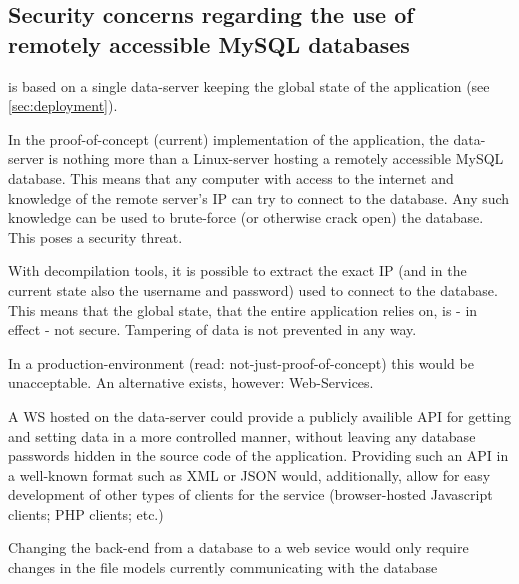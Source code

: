 \subsection{Security concerns regarding the use of remotely accessible MySQL databases}
\label{sec:mysqlvswebservice}

\SOP{} is based on a single data-server keeping the global state of the application (see \ref{sec:deployment}).

In the proof-of-concept (current) implementation of the application, the data-server is nothing more than a Linux-server
hosting a remotely accessible MySQL database. This means that any computer with access to the internet and knowledge of
the remote server's IP can try to connect to the database. Any such knowledge can be used to brute-force (or otherwise
crack open) the database. This poses a security threat.

With decompilation tools, it is possible to extract the exact IP (and in the current state also the username and password)
used to connect to the database. This means that the global state, that the entire application relies on, is - in effect -
not secure. Tampering of data is not prevented in any way.

In a production-environment (read: not-just-proof-of-concept) this would be unacceptable. An alternative exists, however:
Web-Services.

A WS hosted on the data-server could provide a publicly availible API for getting and setting data in a more controlled manner,
without leaving any database passwords hidden in the source code of the application. Providing such an API in a well-known format
such as XML or JSON\cite{ibmREST} would, additionally, allow for easy development of other types of clients for the service (browser-hosted
Javascript clients; PHP clients; etc.)

Changing the back-end from a database to a web sevice would only require changes in the file models currently communicating
with the database
